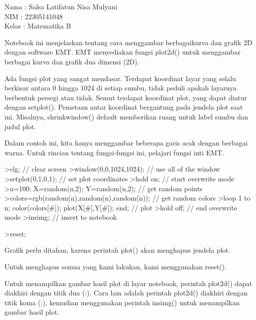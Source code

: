 \documentclass[a4paper,10pt]{article}
\begin{document}
\begin{eulernotebook}
\begin{eulercomment}
Nama : Salsa Latifatun Nisa Mulyani\\
NIM :  22305141048\\
Kelas : Matematika B


\begin{eulercomment}
\begin{eulercomment}
Notebook ini menjelaskan tentang cara menggambar berbagaikurva dan
grafik 2D dengan software EMT. EMT menyediakan fungsi plot2d() untuk
menggambar berbagai kurva dan grafik dua dimensi (2D).\\
\end{eulercomment}
\begin{eulercomment}
Ada fungsi plot yang sangat mendasar. Terdapat koordinat layar yang
selalu berkisar antara 0 hingga 1024 di setiap sumbu, tidak peduli
apakah layarnya berbentuk persegi atau tidak. Semut terdapat koordinat
plot, yang dapat diatur dengan setplot(). Pemetaan antar koordinat
bergantung pada jendela plot saat ini. Misalnya, shrinkwindow()
default memberikan ruang untuk label sumbu dan judul plot.

Dalam contoh ini, kita hanya menggambar beberapa garis acak dengan
berbagai warna. Untuk rincian tentang fungsi-fungsi ini, pelajari
fungsi inti EMT.
\end{eulercomment}
\begin{eulerprompt}
>clg; // clear screen
>window(0,0,1024,1024); // use all of the window
>setplot(0,1,0,1); // set plot coordinates
>hold on; // start overwrite mode
>n=100; X=random(n,2); Y=random(n,2);  // get random points
>colors=rgb(random(n),random(n),random(n)); // get random colors
>loop 1 to n; color(colors[#]); plot(X[#],Y[#]); end; // plot
>hold off; // end overwrite mode
>insimg; // insert to notebook
\end{eulerprompt}
\begin{eulerprompt}
>reset;
\end{eulerprompt}
\begin{eulercomment}
Grafik perlu ditahan, karena perintah plot() akan menghapus jendela
plot.

Untuk menghapus semua yang kami lakukan, kami menggunakan reset().

Untuk menampilkan gambar hasil plot di layar notebook, perintah
plot2d() dapat diakhiri dengan titik dua (:). Cara lain adalah
perintah plot2d() diakhiri dengan titik koma (;), kemudian menggunakan
perintah insimg() untuk menampilkan gambar hasil plot.


\end{eulercomment}
\end{eulercomment}
\end{eulercomment}
\end{eulernotebook}
\end{document}
